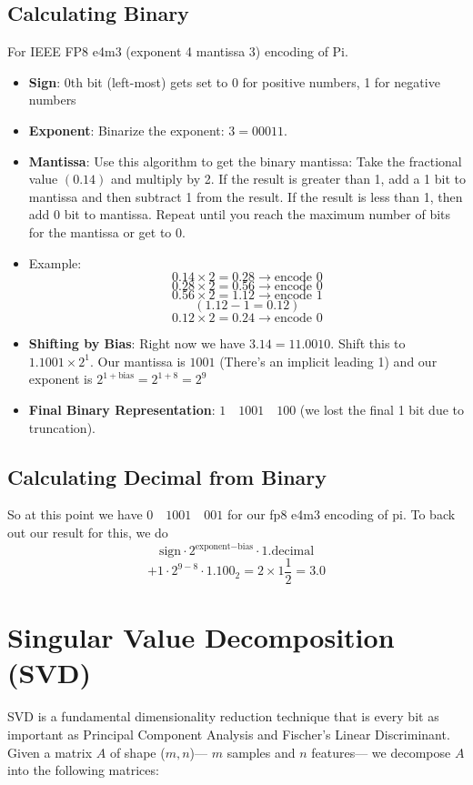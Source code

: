 \documentclass[12pt]{article}
\begin{document}
\subsection{Calculating Binary}
For IEEE FP8 e4m3 (exponent 4 mantissa 3) encoding of Pi.\\
\begin{itemize}
\item \textbf{Sign}: 0th bit (left-most) gets set to 0 for positive numbers, 1 for negative numbers
\item \textbf{Exponent}: Binarize the exponent: \(3 = 00011\). 
\item \textbf{Mantissa}: Use this algorithm to get the binary mantissa: Take the fractional value \((0.14)\) and multiply by 2. If the result is greater than 1, add a 1 bit to mantissa and then subtract 1 from the result. If the result is less than 1, then add 0 bit to mantissa. Repeat until you reach the maximum number of bits for the mantissa or get to 0.
\item Example:
\[0.14 \times 2 = 0.28 \rightarrow \text{encode } 0\]
\[0.28 \times 2 = 0.56 \rightarrow \text{encode } 0\]
\[0.56 \times 2 = 1.12 \rightarrow \text{encode } 1\]
\[(1.12 - 1 = 0.12)\]
\[0.12 \times 2 = 0.24 \rightarrow \text{encode } 0\]
\item \textbf{Shifting by Bias}: Right now we have \(3.14 = 11.0010\). Shift this to \(1.1001 \times 2^1\). Our mantissa is \(1001\) (There's an implicit leading 1) and our exponent is \(2^{1 + \text{bias}}=2^{1+8} = 2^9\)
\item \textbf{Final Binary Representation}: \(1 \quad 1001 \quad 100 \) (we lost the final 1 bit due to truncation).
\end{itemize}
\subsection{Calculating Decimal from Binary}
So at this point we have \(0 \quad 1001 \quad 001\) for our fp8 e4m3 encoding of pi. To back out our result for this, we do \[\text{sign} \cdot 2^{\text{exponent} - \text{bias}} \cdot 1.\text{decimal}\]
\[+1 \cdot 2^{9-8} \cdot 1.100_2 = 2 \times 1\frac{1}{2} = 3.0\]
\section{Singular Value Decomposition (SVD)}
SVD is a fundamental dimensionality reduction technique that is every bit as important as Principal Component Analysis and Fischer's Linear Discriminant. Given a matrix \(A\) of shape (\(m, n\))— \(m\) samples and \(n\) features— we decompose \(A\) into the following matrices:
\end{document}

